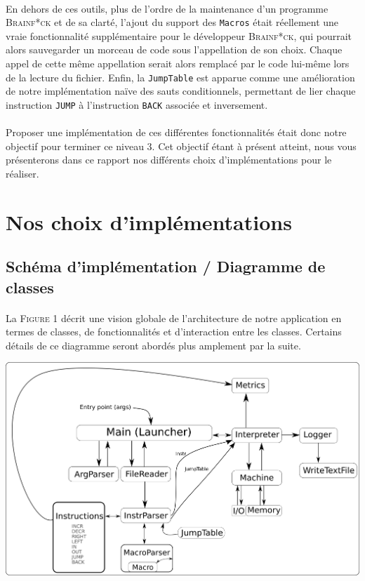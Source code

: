 \documentclass[a4paper]{article}
\begin{document}
\paragraph{}En dehors de ces outils, plus de l'ordre de la maintenance d'un programme \textsc{Brainf*ck} et de sa clarté, l'ajout du support des \texttt{Macros} était réellement une vraie fonctionnalité supplémentaire pour le développeur \textsc{Brainf*ck}, qui pourrait alors sauvegarder un morceau de code sous l'appellation de son choix. Chaque appel de cette même appellation serait alors remplacé par le code lui-même lors de la lecture du fichier. Enfin, la \texttt{JumpTable} est apparue comme une amélioration de notre implémentation naïve des sauts conditionnels, permettant de lier chaque instruction \texttt{JUMP} à l'instruction \texttt{BACK} associée et inversement.
\paragraph{}Proposer une implémentation de ces différentes fonctionnalités était donc notre objectif pour terminer ce niveau 3. Cet objectif étant à présent atteint, nous vous présenterons dans ce rapport nos différents choix d'implémentations pour le réaliser.

\section{Nos choix d'implémentations}

\subsection{Schéma d'implémentation / Diagramme de classes}
\paragraph{}La \textsc{Figure 1} décrit une vision globale de l'architecture de notre application en termes de classes, de fonctionnalités et d'interaction entre les classes. Certains détails de ce diagramme seront abordés plus amplement par la suite.
\begin{center}
	\includegraphics[scale=0.7]{pres23.png}
\end{center}
\end{document}
